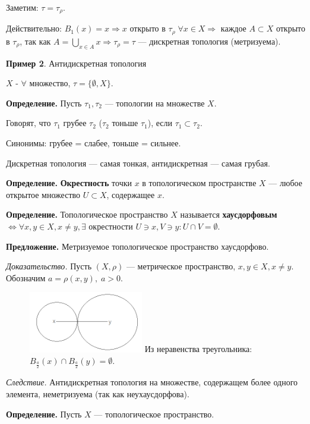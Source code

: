 \documentclass[12pt,a4paper]{article}
\begin{document}
Заметим: $\tau = \tau_{\rho}.$

Действительно: $B_1(x) = {x} \Rightarrow {x}$ открыто в $\tau_{\rho} \; \forall x \in X \Rightarrow$ каждое $A \subset X$ открыто в $\tau_{\rho}$, так как $A = \bigcup_{x\in A} {x} \Rightarrow \tau_{\rho} = \tau$ --- дискретная топология (метризуема).

\textbf{Пример 2}. Антидискретная топология

$X$ - $\forall$ множество, $\tau = \{\emptyset, X\}.$

\textbf{Определение.} Пусть $\tau_1, \tau_2$ --- топологии на множестве $X.$

Говорят, что $\tau_1$ грубее $\tau_2$ ($\tau_2$ тоньше $\tau_1$), если $\tau_1 \subset \tau_2.$

Синонимы: грубее = слабее, тоньше = сильнее.

Дискретная топология --- самая тонкая, антидискретная --- самая грубая.

\textbf{Определение.} \textbf{Окрестность} точки $x$ в топологическом пространстве $X$ --- любое открытое множество $U \subset X$, содержащее $x.$

\textbf{Определение.} Топологическое пространство $X$ называется \textbf{хаусдорфовым} $\Leftrightarrow \forall x, y \in X, x \neq y, \exists$ окрестности $U \ni x, V \ni y: U \cap V = \emptyset.$

\textbf{Предложение.} Метризуемое топологическое пространство хаусдорфово.

\textit{Доказательство.} Пусть $(X, \rho)$ --- метрическое пространство, $x, y \in X, x \neq y$. Обозначим $a = \rho(x, y), \; a > 0.$

\begin{figure}
	\includegraphics[width = 5cm]{lect2_4.png}
	Из неравенства треугольника: $B_{\frac{a}{2}}(x) \cap B_{\frac{a}{2}}(y) = \emptyset.$
\end{figure}

\textit{Следствие.} Антидискретная топология на множестве, содержащем более одного элемента, неметризуема (так как неухаусдорфова).

\textbf{Определение.} Пусть $X$ --- топологическое пространство.
\end{document}
